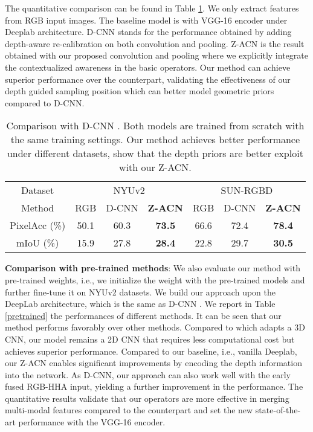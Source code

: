 \documentclass[lettersize,journal]{IEEEtran}
\begin{document}
The quantitative comparison can be found in Table \ref{compdcnn}. We only extract features from RGB input images. The baseline model is with VGG-16 encoder under Deeplab \cite{chen2017deeplab} architecture. D-CNN stands for the performance obtained by adding depth-aware re-calibration on both convolution and pooling. Z-ACN is the result obtained with our proposed convolution and pooling where we explicitly integrate the contextualized awareness in the basic operators. Our method can achieve superior performance over the counterpart, validating the effectiveness of our depth guided sampling position which can better model geometric priors compared to D-CNN.




\begin{table}[t]
\centering
\setlength\tabcolsep{3pt}
\setlength\extrarowheight{0pt}
\caption{Comparison with D-CNN \cite{Wang2018DCNN}. Both models are trained from scratch with the same training settings. Our method achieves better performance under different datasets, show that the depth priors are better exploit with our Z-ACN.}
\begin{tabular}[ht]{ c c c c | c c c}
\hline
Dataset & \multicolumn{3}{c|}{NYUv2} & \multicolumn{3}{c}{SUN-RGBD} \\
Method  & RGB & D-CNN &  \textbf{Z-ACN} & RGB & D-CNN &  \textbf{Z-ACN} \\
\hline
PixelAcc (\%)& 50.1& 60.3 & \textbf{73.5} &66.6 & 72.4  & \textbf{78.4}  \\
mIoU (\%)& 15.9& 27.8 & \textbf{28.4} & 22.8 & 29.7  & \textbf{30.5}  \\
\hline
\end{tabular}

\label{compdcnn}
\end{table}

\textbf{Comparison with pre-trained methods}: We also evaluate our method with pre-trained weights, i.e., we initialize the weight with the pre-trained models and further fine-tune it on NYUv2 datasets. We build our approach upon the DeepLab architecture, which is the same as D-CNN \cite{Wang2018DCNN}. We report in Table \ref{pretrained} the performances of different methods. It can be seen that our method performs favorably over other methods. Compared to \cite{Qi2017Graph} which adapts a 3D CNN, our model remains a 2D CNN that requires less computational cost but achieves superior performance. Compared to our baseline, i.e., vanilla Deeplab, our Z-ACN enables significant improvements by encoding the depth information into the network. As D-CNN, our approach can also work well with the early fused RGB-HHA input, yielding a further improvement in the performance. The quantitative results validate that our operators are more effective in merging multi-modal features compared to the counterpart and set the new state-of-the-art performance with the VGG-16 encoder. 
\end{document}
